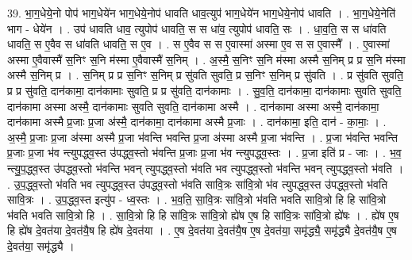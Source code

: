 \documentclass[17pt]{extarticle}
\begin{document}
39. भा॒ग॒धेये॒नो पोप॑ भाग॒धेये॑न भाग॒धेये॒नोप॑ धावति धाव॒त्युप॑ भाग॒धेये॑न भाग॒धेये॒नोप॑ धावति । . भा॒ग॒धेये॒नेति॑ भाग - धेये॑न । . उप॑ धावति धाव॒ त्युपोप॑ धावति॒ स स धा॑व॒ त्युपोप॑ धावति॒ सः । . धा॒व॒ति॒ स स धा॑वति धावति॒ स ए॒वैव स धा॑वति धावति॒ स ए॒व । . स ए॒वैव स स ए॒वास्मा॑ अस्मा ए॒व स स ए॒वास्मै᳚ । . ए॒वास्मा॑ अस्मा ए॒वैवास्मै॑ स॒निꣳ स॒नि म॑स्मा ए॒वैवास्मै॑ स॒निम् । . अ॒स्मै॒ स॒निꣳ स॒नि म॑स्मा अस्मै स॒निम् प्र प्र स॒नि म॑स्मा अस्मै स॒निम् प्र । . स॒निम् प्र प्र स॒निꣳ स॒निम् प्र सु॑वति सुवति॒ प्र स॒निꣳ स॒निम् प्र सु॑वति । . प्र सु॑वति सुवति॒ प्र प्र सु॑वति॒ दान॑कामा॒ दान॑कामाः सुवति॒ प्र प्र सु॑वति॒ दान॑कामाः । . सु॒व॒ति॒ दान॑कामा॒ दान॑कामाः सुवति सुवति॒ दान॑कामा अस्मा अस्मै॒ दान॑कामाः सुवति सुवति॒ दान॑कामा अस्मै । . दान॑कामा अस्मा अस्मै॒ दान॑कामा॒ दान॑कामा अस्मै प्र॒जाः प्र॒जा अ॑स्मै॒ दान॑कामा॒ दान॑कामा अस्मै प्र॒जाः । . दान॑कामा॒ इति॒ दान॑ - का॒माः॒ । . अ॒स्मै॒ प्र॒जाः प्र॒जा अ॑स्मा अस्मै प्र॒जा भ॑वन्ति भवन्ति प्र॒जा अ॑स्मा अस्मै प्र॒जा भ॑वन्ति । . प्र॒जा भ॑वन्ति भवन्ति प्र॒जाः प्र॒जा भ॑व न्त्युपद्ध्व॒स्त उ॑पद्ध्व॒स्तो भ॑वन्ति प्र॒जाः प्र॒जा 
भ॑व न्त्युपद्ध्व॒स्तः । . प्र॒जा इति॑ प्र - जाः । . भ॒व॒ न्त्यु॒प॒द्ध्व॒स्त उ॑पद्ध्व॒स्तो भ॑वन्ति भवन् त्युपद्ध्व॒स्तो भ॑वति भव त्युपद्ध्व॒स्तो भ॑वन्ति भवन् त्युपद्ध्व॒स्तो भ॑वति । . उ॒प॒द्ध्व॒स्तो भ॑वति भव त्युपद्ध्व॒स्त उ॑पद्ध्व॒स्तो भ॑वति सावि॒त्रः सा॑वि॒त्रो भ॑व त्युपद्ध्व॒स्त उ॑पद्ध्व॒स्तो भ॑वति सावि॒त्रः । . उ॒प॒द्ध्व॒स्त इत्यु॑प - ध्व॒स्तः । . भ॒व॒ति॒ सा॒वि॒त्रः सा॑वि॒त्रो भ॑वति भवति सावि॒त्रो हि हि सा॑वि॒त्रो भ॑वति भवति सावि॒त्रो हि । . सा॒वि॒त्रो हि हि सा॑वि॒त्रः सा॑वि॒त्रो ह्ये॑ष ए॒ष हि सा॑वि॒त्रः सा॑वि॒त्रो ह्ये॑षः । . ह्ये॑ष ए॒ष हि ह्ये॑ष दे॒वत॑या दे॒वत॑यै॒ष हि ह्ये॑ष दे॒वत॑या । . ए॒ष दे॒वत॑या दे॒वत॑यै॒ष ए॒ष दे॒वत॑या॒ समृ॑द्ध्यै॒ समृ॑द्ध्यै दे॒वत॑यै॒ष ए॒ष दे॒वत॑या॒ समृ॑द्ध्यै । \newline
\pagebreak
{}
\end{document}

